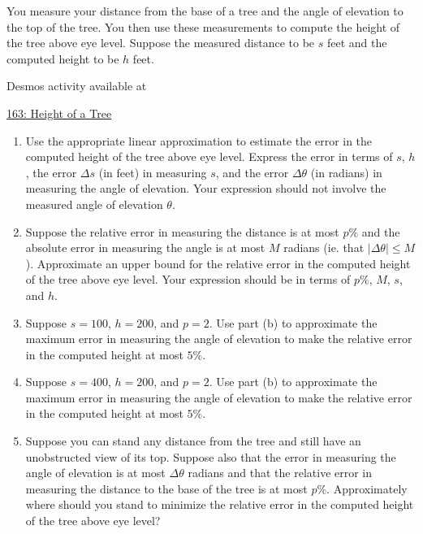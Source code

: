 \documentclass{ximera}
\begin{document}
\begin{question} \label{Qler3r3efr}

You measure your distance from the base of a tree and the angle of elevation to the top of the tree. You then use these measurements to compute the height of the tree above eye level. Suppose the measured distance to be $s$ feet and the computed height to be $h$ feet.

\begin{onlineOnly}
    \begin{center}
\end{center}
\end{onlineOnly}

Desmos activity available at

\href{https://www.desmos.com/calculator/9wszawkbiy}{163: Height of a Tree}


\begin{enumerate}

\item Use the appropriate linear approximation to estimate the error in the computed height of the tree above eye level. Express the error in terms of $s$, $h$, the error $\Delta s$ (in feet) in measuring $s$, and the error $\Delta \theta$ (in radians) in measuring the angle of elevation. Your expression should not involve the measured angle of elevation $\theta$.

\item  Suppose the relative error in measuring the distance is at most $p\%$ and the absolute error in measuring the angle is at most $M$ radians (ie. that $|\Delta \theta|\leq M$). Approximate an upper bound for the relative error in the computed height of the tree above eye level. Your expression should be in terms of  $p\%$, $M$, $s$, and $h$.            %

\item Suppose $s=100$, $h=200$, and $p=2$. Use part (b) to approximate the maximum error in measuring the angle of elevation to make the relative error in the computed height at most $5\%$.

\item Suppose $s=400$, $h=200$, and $p=2$. Use part (b) to approximate the maximum error in measuring the angle of elevation to make the relative error in the computed height at most $5\%$.

\item Suppose  you can stand any distance from the tree and still have an unobstructed view of its top. Suppose also that the error in measuring the angle of elevation is at most $\Delta \theta$ radians and that the relative error in measuring the distance to the base of the tree is at most $p\%$. Approximately where should you stand to minimize the relative error in the computed height of the tree above eye level?

\end{enumerate}

\end{question}
\end{document}
